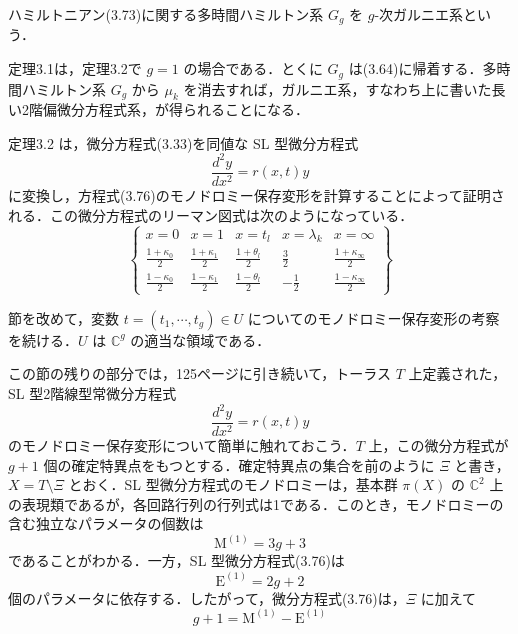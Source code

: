 \begin{story}
\begin{definition}[$g$-次ガルニエ系]
ハミルトニアン(3.73)に関する多時間ハミルトン系 $G_g$ を $g$-次ガルニエ系という．
\end{definition}
定理3.1は，定理3.2で $g=1$ の場合である．とくに $G_g$ は(3.64)に帰着する．多時間ハミルトン系 $G_g$ から $\mu_k$ を消去すれば，ガルニエ系，すなわち上に書いた長い2階偏微分方程式系，が得られることになる．

定理3.2 は，微分方程式(3.33)を同値な SL 型微分方程式
\begin{equation}
\frac{d^2 y}{dx^2} = r(x,t)y \label{eq:3.76}
\end{equation}
に変換し，方程式(3.76)のモノドロミー保存変形を計算することによって証明される．この微分方程式のリーマン図式は次のようになっている．
\begin{equation*}
\left\{
\begin{array}{ccccc}
x=0 & x=1 & x=t_l & x=\lambda_k & x=\infty \\
\frac{1+\kappa_0}{2} & \frac{1+\kappa_1}{2} & \frac{1+\theta_l}{2} & \frac{3}{2} & \frac{1+\kappa_\infty}{2} \\
\frac{1-\kappa_0}{2} & \frac{1-\kappa_1}{2} & \frac{1-\theta_l}{2} & -\frac{1}{2} & \frac{1-\kappa_\infty}{2}
\end{array}
\right\}
\end{equation*}

節を改めて，変数 $t=(t_1, \cdots, t_g) \in U$ についてのモノドロミー保存変形の考察を続ける．$U$ は $\mathbb{C}^g$ の適当な領域である．

この節の残りの部分では，125ページに引き続いて，トーラス $T$ 上定義された，SL 型2階線型常微分方程式
\begin{equation}
\frac{d^2 y}{dx^2} = r(x,t)y \tag{3.76}
\end{equation}
のモノドロミー保存変形について簡単に触れておこう．$T$ 上，この微分方程式が $g+1$ 個の確定特異点をもつとする．確定特異点の集合を前のように $\Xi$ と書き，$X = T \setminus \Xi$ とおく．SL 型微分方程式のモノドロミーは，基本群 $\pi(X)$ の $\mathbb{C}^2$ 上の表現類であるが，各回路行列の行列式は1である．このとき，モノドロミーの含む独立なパラメータの個数は
\begin{equation*}
\mathrm{M}^{(1)} = 3g+3
\end{equation*}
であることがわかる．一方，SL 型微分方程式(3.76)は
\begin{equation*}
\mathrm{E}^{(1)} = 2g+2
\end{equation*}
個のパラメータに依存する．したがって，微分方程式(3.76)は，$\Xi$ に加えて
\begin{equation*}
g+1 = \mathrm{M}^{(1)} - \mathrm{E}^{(1)}
\end{equation*}
\end{story}


